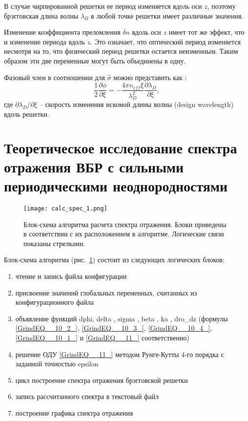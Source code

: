 В случае чирпированной решетки ее период изменяется вдоль оси $z$, поэтому брэгговская длина волны $\lambda_B$ в любой точке решетки имеет различные значения.

Изменение коэффициента преломления $\delta n$ вдоль оси $z$ имеет тот же эффект, что и изменение периода вдоль $z$. Это означает, что оптический период изменяется несмотря на то, что физический период решетки остается неизменным. Таким образом эти две переменные могут быть объединены в одну.

Фазовый член в соотношении для $\hat{\sigma}$ можно представить как \cite{b1}:
\begin{equation}\label{eq1.43}
    \frac{1}{2}\frac{\partial\phi}{\partial\xi}=-\frac{4\pi n_{eff}\xi}{\lambda_D^2}\frac{\partial\lambda_D}{\partial\xi},
\end{equation}
где $\partial\lambda_D / \partial\xi$ -- скорость изменения искомой длины волны (design wavelength) вдоль решетки.


\section{Теоретическое исследование спектра отражения ВБР с сильными периодическими неоднородностями}

\begin{figure}
\centering
\texttt{[image: calc\_spec\_1.png]}
\caption{Блок-схема алгоритма расчета спектра отражения. Блоки приведены в соответствии с их расположением в алгоритме. Логические связи показаны стрелками.}\label{fig:calc_spec_1}
\end{figure}

Блок-схема алгоритма (рис.~\ref{fig:calc_spec_1}) состоит из следующих логических блоков:

\begin{enumerate}
\item  чтение и запись файла конфигурации
\item  присвоение значений глобальных переменных, считанных из конфигурационного файла
\item  объявление функций dphi, delta , sigma , beta , ka , dro\_dz  (формулы \eqref{GrindEQ__10_2_}, \eqref{GrindEQ__10_3_}, \eqref{GrindEQ__10_4_}, \eqref{GrindEQ__10_1_} и \eqref{GrindEQ__11_} соответственно)
\item  решение ОДУ \eqref{GrindEQ__11_} методом Рунге-Кутты 4-го порядка с заданной точностью epsilon
\item  цикл построение спектра отражения брэгговской решетки
\item  запись рассчитанного спектра в текстовый файл
\item  построение графика спектра отражения
\end{enumerate}

